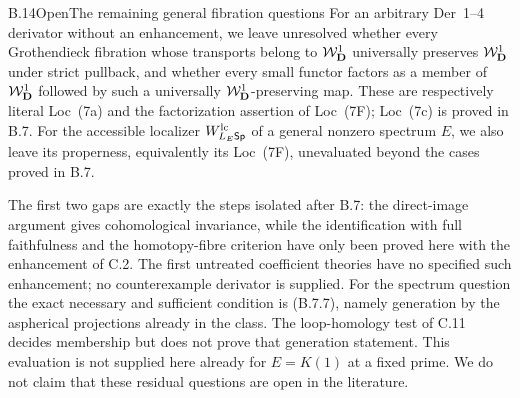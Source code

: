 \begin{claim}{B.14}{Open}{The remaining general fibration questions}
For an arbitrary Der~1--4 derivator without an enhancement, we leave
unresolved whether every Grothendieck fibration whose transports
belong to $\mathcal W_{\mathbf D}^{1}$ universally preserves $\mathcal W_{\mathbf D}^{1}$ under strict
pullback, and whether every small functor factors as a member of
$\mathcal W_{\mathbf D}^{1}$ followed by such a universally $\mathcal W_{\mathbf D}^{1}$-preserving map.
These are respectively literal Loc~(7a) and the factorization
assertion of Loc~(7F); Loc~(7c) is proved in B.7.
For the accessible localizer $W^{\mathrm{lc}}_{L_E\mathsf{Sp}}$ of a general
nonzero spectrum $E$, we also leave its properness, equivalently
its Loc~(7F), unevaluated beyond the cases proved in B.7.
\end{claim}
The first two gaps are exactly the steps isolated after B.7:
the direct-image argument gives cohomological invariance, while
the identification with full faithfulness and the homotopy-fibre
criterion have only been proved here with the enhancement of C.2.
The first untreated coefficient theories have no specified such
enhancement; no counterexample derivator is supplied. For the
spectrum question the exact necessary and sufficient condition is
(B.7.7), namely generation by the aspherical projections already
in the class. The loop-homology test of C.11 decides membership
but does not prove that generation statement. This evaluation is
not supplied here already for $E=K(1)$ at a fixed prime. We do
not claim that these residual questions are open in the literature.


